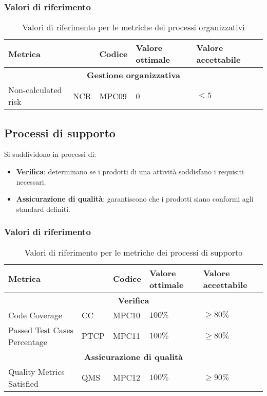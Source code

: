 \subsubsection{Valori di riferimento}
\begin{table}[H]
    \centering
    \begin{tabularx}{\textwidth}{p{3.5cm}|X|X|l|l}
        \hline
        \multicolumn{2}{l|}{\textbf{Metrica}} & \textbf{Codice}   & \textbf{Valore ottimale}  & \textbf{Valore accettabile}   \\
        \hline
        \multicolumn{5}{c}{\textbf{Gestione organizzativa}} \\
        \hline
        Non-calculated risk              & NCR    & MPC09 & 0               & $\le 5$                   \\
        \hline
    \end{tabularx}
    \caption{Valori di riferimento per le metriche dei processi organizzativi}
\end{table}

\subsection{Processi di supporto}
Si suddividono in processi di:
\begin{itemize}
    \item \textbf{Verifica}: determinano se i prodotti di una attività soddisfano i requisiti necessari.
    \item \textbf{Assicurazione di qualità}: garantiscono che i prodotti siano conformi agli standard definiti.
\end{itemize}
\subsubsection{Valori di riferimento}
\begin{table}[H]
    \centering
    \begin{tabularx}{\textwidth}{p{3.5cm}|X|X|l|l}
        \hline
        \multicolumn{2}{l|}{\textbf{Metrica}} & \textbf{Codice}   & \textbf{Valore ottimale}  & \textbf{Valore accettabile}   \\
        \hline
        \multicolumn{5}{c}{\textbf{Verifica}} \\
        \hline
        Code Coverage              & CC    & MPC10 & $100\%$               & $\ge 80\%$                   \\
        Passed Test Cases Percentage & PTCP & MPC11& $100\%$ & $\ge 80\%$ \\
        \hline 
        \multicolumn{5}{c}{\textbf{Assicurazione di qualità}} \\
        \hline
        Quality Metrics Satisfied & QMS & MPC12 & $100\%$ & $\ge 90\%$ \\
        \hline
    \end{tabularx}
    \caption{Valori di riferimento per le metriche dei processi di supporto}
\end{table}